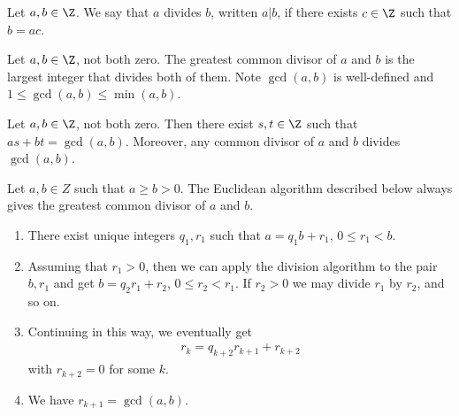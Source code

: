 \documentclass{article}
\begin{document}
\begin{definition}
    Let $a,b\in\Z$. We say that $a$ divides $b$, written $a|b$, if there exists $c\in\Z$
    such that $b=ac$.
\end{definition}

\begin{definition}
    Let $a,b\in\Z$, not both zero. The greatest common divisor of $a$ and $b$ is the largest integer
    that divides both of them. Note $\gcd(a,b)$ is well-defined and $1\leq\gcd(a,b)\leq\min(a,b)$.
\end{definition}

\begin{lemma}[Bezout]
    Let $a,b\in\Z$, not both zero. Then there exist $s,t\in\Z$ such that
    $as + bt = \gcd(a,b)$. Moreover, any common divisor of $a$ and $b$ divides $\gcd(a,b)$.
\end{lemma}

\begin{theorem}
    Let $a,b\in Z$ such that $a\geq b>0$.
    The Euclidean algorithm described below always gives the greatest common divisor of
    $a$ and $b$.
    \begin{enumerate}
        \item There exist unique integers $q_1,r_1$ such that $a=q_1b+r_1$, $0\leq r_1<b$.
        \item Assuming that $r_1>0$, then we can apply the division algorithm to the pair
              $b,r_1$ and get $b=q_2r_1 + r_2$, $0\leq r_2<r_1$. If $r_2>0$ we may divide
              $r_1$ by $r_2$, and so on.
        \item Continuing in this way, we eventually get \begin{align*}
                  r_k=q_{k+2}r_{k+1}+r_{k+2}
              \end{align*}
              with $r_{k+2}=0$ for some $k$.
        \item We have $r_{k+1}=\gcd(a,b)$.
    \end{enumerate}
\end{theorem}
\end{document}
